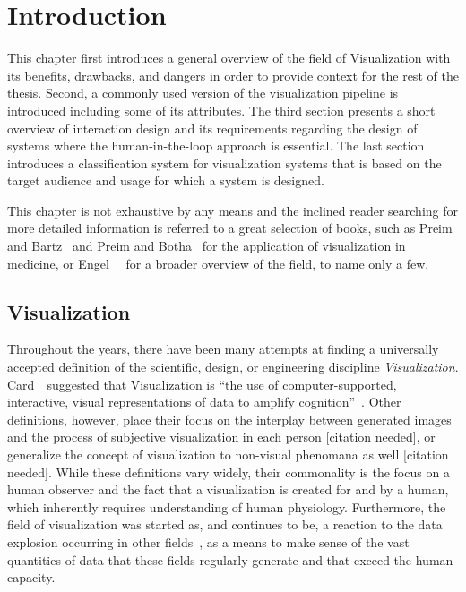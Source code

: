 \chapter{Introduction} \label{cha:intro}
This chapter first introduces a general overview of the field of Visualization with its benefits, drawbacks, and dangers in order to provide context for the rest of the thesis.  Second, a commonly used version of the visualization pipeline is introduced including some of its attributes.  The third section presents a short overview of interaction design and its requirements regarding the design of systems where the human-in-the-loop approach is essential.  The last section introduces a classification system for visualization systems that is based on the target audience and usage for which a system is designed.

This chapter is not exhaustive by any means and the inclined reader searching for more detailed information is referred to a great selection of books, such as Preim and Bartz~\cite{preim2007visualization} and Preim and Botha~\cite{preim2013visual} for the application of visualization in medicine, or Engel~\etal~\cite{engel2006real} for a broader overview of the field, to name only a few.

\section{Visualization} \label{cha:intro:vis}
Throughout the years, there have been many attempts at finding a universally accepted definition of the scientific, design, or engineering discipline \emph{Visualization}.  Card~\etal~suggested that Visualization is ``the use of computer-supported, interactive, visual representations of data to amplify cognition''~\cite{card1999readings}.  Other definitions, however, place their focus on the interplay between generated images and the process of subjective visualization in each person [citation needed], or generalize the concept of visualization to non-visual phenomana as well [citation needed].  While these definitions vary widely, their commonality is the focus on a human observer and the fact that a visualization is created for and by a human, which inherently requires understanding of human physiology.  Furthermore, the field of visualization was started as, and continues to be, a reaction to the data explosion occurring in other fields~\cite{lorensen2004death}, as a means to make sense of the vast quantities of data that these fields regularly generate and that exceed the human capacity.

